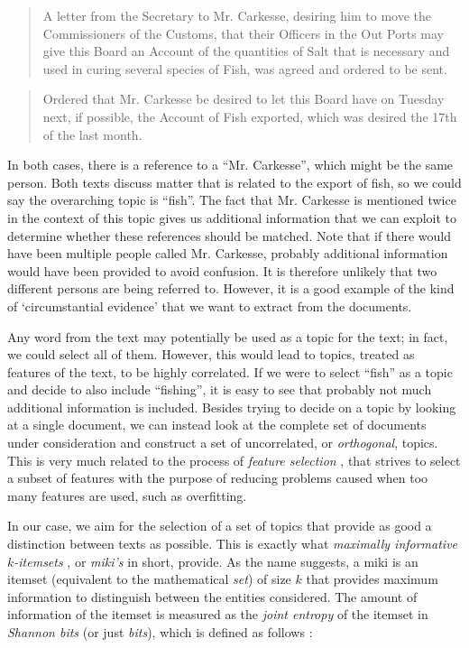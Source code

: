 \begin{quote}
    A letter from the Secretary to Mr. Carkesse, desiring him to move the Commissioners of the Customs, that their Officers in the Out Ports may give this Board an Account of the quantities of Salt that is necessary and used in curing several species of Fish, was agreed and ordered to be sent.
\end{quote}

\begin{quote}
    Ordered that Mr. Carkesse be desired to let this Board have on Tuesday next, if possible, the Account of Fish exported, which was desired the 17th of the last month.
\end{quote}

\noindent In both cases, there is a reference to a ``Mr. Carkesse'', which might be the same person.
Both texts discuss matter that is related to the export of fish, so we could say the overarching topic is ``fish''.
The fact that Mr. Carkesse is mentioned twice in the context of this topic gives us additional information that we can exploit to determine whether these references should be matched.
Note that if there would have been multiple people called Mr. Carkesse, probably additional information would have been provided to avoid confusion.
It is therefore unlikely that two different persons are being referred to.
However, it is a good example of the kind of `circumstantial evidence' that we want to extract from the documents.

Any word from the text may potentially be used as a topic for the text; in fact, we could select all of them.
However, this would lead to topics, treated as features of the text, to be highly correlated.
If we were to select ``fish'' as a topic and decide to also include ``fishing'', it is easy to see that probably not much additional information is included.
Besides trying to decide on a topic by looking at a single document, we can instead look at the complete set of documents under consideration and construct a set of uncorrelated, or \emph{orthogonal}, topics.
This is very much related to the process of \emph{feature selection} \citep{Knobbe2006}, that strives to select a subset of features with the purpose of reducing problems caused when too many features are used, such as overfitting.

In our case, we aim for the selection of a set of topics that provide as good a distinction between texts as possible.
This is exactly what \emph{maximally informative $k$-itemsets} \citep{Knobbe2006}, or \emph{miki's} in short, provide.
As the name suggests, a miki is an itemset (equivalent to the mathematical \emph{set}) of size $k$ that provides maximum information to distinguish between the entities considered.
The amount of information of the itemset is measured as the \emph{joint entropy} of the itemset in \emph{Shannon bits} (or just \emph{bits}), which is defined as follows \citep{Knobbe2006}:

